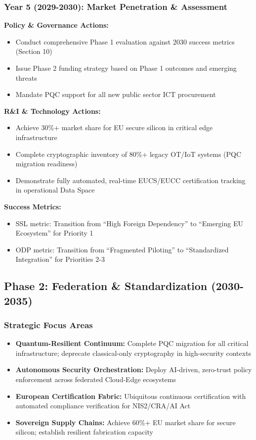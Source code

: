 \documentclass{ieeeaccess}
\begin{document}
\subsubsection*{Year 5 (2029-2030): Market Penetration \& Assessment}
\textbf{Policy \& Governance Actions:}
\begin{itemize}
    \item Conduct comprehensive Phase 1 evaluation against 2030 success metrics (Section 10)
    \item Issue Phase 2 funding strategy based on Phase 1 outcomes and emerging threats
    \item Mandate PQC support for all new public sector ICT procurement
\end{itemize}

\textbf{R\&I \& Technology Actions:}
\begin{itemize}
    \item Achieve 30\%+ market share for EU secure silicon in critical edge infrastructure
    \item Complete cryptographic inventory of 80\%+ legacy OT/IoT systems (PQC migration readiness)
    \item Demonstrate fully automated, real-time EUCS/EUCC certification tracking in operational Data Space
\end{itemize}

\textbf{Success Metrics:}
\begin{itemize}
    \item SSL metric: Transition from ``High Foreign Dependency''  to ``Emerging EU Ecosystem''  for Priority 1
    \item ODP metric: Transition from ``Fragmented Piloting''  to ``Standardized Integration''  for Priorities 2-3
\end{itemize}

\subsection*{Phase 2: Federation \& Standardization (2030-2035)}

\subsubsection*{Strategic Focus Areas}
\begin{itemize}
    \item \textbf{Quantum-Resilient Continuum:} Complete PQC migration for all critical infrastructure; deprecate classical-only cryptography in high-security contexts
    \item \textbf{Autonomous Security Orchestration:} Deploy AI-driven, zero-trust policy enforcement across federated Cloud-Edge ecosystems
    \item \textbf{European Certification Fabric:} Ubiquitous continuous certification with automated compliance verification for NIS2/CRA/AI Act
    \item \textbf{Sovereign Supply Chains:} Achieve 60\%+ EU market share for secure silicon; establish resilient fabrication capacity
\end{itemize}
\end{document}
